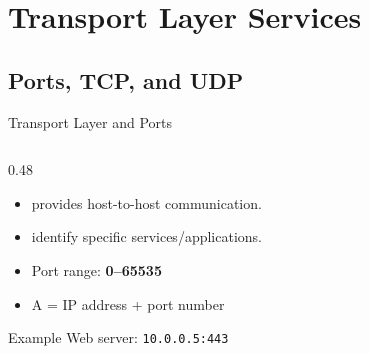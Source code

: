 \documentclass[aspectratio=169]{beamer}  %
\begin{document}
\section{Transport Layer Services}
\subsection{Ports, TCP, and UDP}


\begin{frame}{Transport Layer and Ports}
    \begin{columns}[T]
        \begin{column}{0.48\textwidth}
            \begin{itemize}
                \item {} provides host-to-host communication.
                \item {} identify specific services/applications.
                \item Port range: \textbf{0--65535}
                \item A  = IP address + port number
            \end{itemize}
            
            \vspace{0.2em}
            \begin{exampleblock}{Example}
                \small
                Web server: \texttt{10.0.0.5:443}
            \end{exampleblock}
        \end{column}
    \end{columns}
\end{frame}
\end{document}
